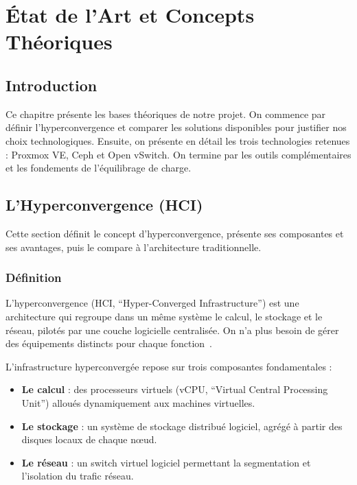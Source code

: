 \chapter{État de l'Art et Concepts Théoriques}
\thispagestyle{empty}
\newpage

\section{Introduction}

\par Ce chapitre présente les bases théoriques de notre projet. On commence par définir l'hyperconvergence et comparer les solutions disponibles pour justifier nos choix technologiques. Ensuite, on présente en détail les trois technologies retenues : Proxmox VE, Ceph et Open vSwitch. On termine par les outils complémentaires et les fondements de l'équilibrage de charge.\\

\section{L'Hyperconvergence (HCI)}

\par Cette section définit le concept d'hyperconvergence, présente ses composantes et ses avantages, puis le compare à l'architecture traditionnelle.\\

\subsection{Définition}

\par L'hyperconvergence (HCI, ``Hyper-Converged Infrastructure'') est une architecture qui regroupe dans un même système le calcul, le stockage et le réseau, pilotés par une couche logicielle centralisée. On n'a plus besoin de gérer des équipements distincts pour chaque fonction~\cite{ref2, ref7}.\\

\par L'infrastructure hyperconvergée repose sur trois composantes fondamentales :\\

\begin{itemize}

    \item \textbf{Le calcul} : des processeurs virtuels (vCPU, ``Virtual Central Processing Unit'') alloués dynamiquement aux machines virtuelles.

    \item \textbf{Le stockage} : un système de stockage distribué logiciel, agrégé à partir des disques locaux de chaque n\oe{}ud.

    \item \textbf{Le réseau} : un switch virtuel logiciel permettant la segmentation et l'isolation du trafic réseau.

\end{itemize}

